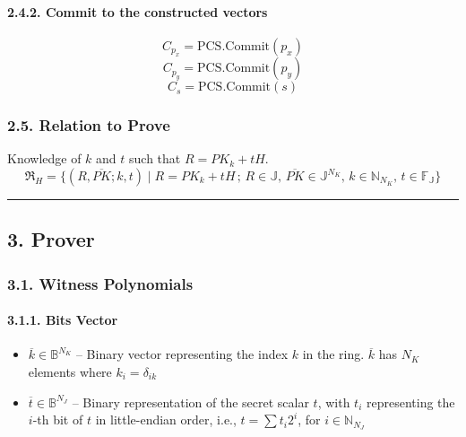 \documentclass[
]{article}
\begin{document}
\hypertarget{commit-to-the-constructed-vectors}{%
\paragraph{2.4.2. Commit to the constructed
vectors}\label{commit-to-the-constructed-vectors}}

\[C_{p_x} = \text{PCS.Commit}(p_x)\]
\[C_{p_y} = \text{PCS.Commit}(p_y)\] \[C_s = \text{PCS.Commit}(s)\]

\hypertarget{relation-to-prove}{%
\subsubsection{2.5. Relation to Prove}\label{relation-to-prove}}

Knowledge of \(k\) and \(t\) such that \(R = PK_k + tH\).
\[\mathfrak{R}_H = \{ (R, \overline{PK}; k, t) \mid R = PK_k + tH \,;\, R \in \mathbb{J}, \, \overline{PK} \in \mathbb{J}^{N_K}, \, k \in \mathbb{N}_{N_K}, \, t \in \mathbb{F_J} \}\]

\begin{center}\rule{0.5\linewidth}{0.5pt}\end{center}

\hypertarget{prover}{%
\subsection{3. Prover}\label{prover}}

\hypertarget{witness-polynomials}{%
\subsubsection{3.1. Witness Polynomials}\label{witness-polynomials}}

\hypertarget{bits-vector}{%
\paragraph{3.1.1. Bits Vector}\label{bits-vector}}

\begin{itemize}
\item
  \(\overline{k} \in \mathbb{B}^{N_K}\) -- Binary vector representing
  the index \(k\) in the ring. \(\overline{k}\) has \(N_K\) elements
  where \(k_i = \delta_{ik}\)
\item
  \(\overline{t} \in \mathbb{B}^{N_J}\) -- Binary representation of the
  secret scalar \(t\), with \(t_i\) representing the \(i\)-th bit of
  \(t\) in little-endian order, i.e., \(t = \sum t_i 2^i\), for
  \(i \in \mathbb{N}_{N_J}\)
\end{itemize}
\end{document}
